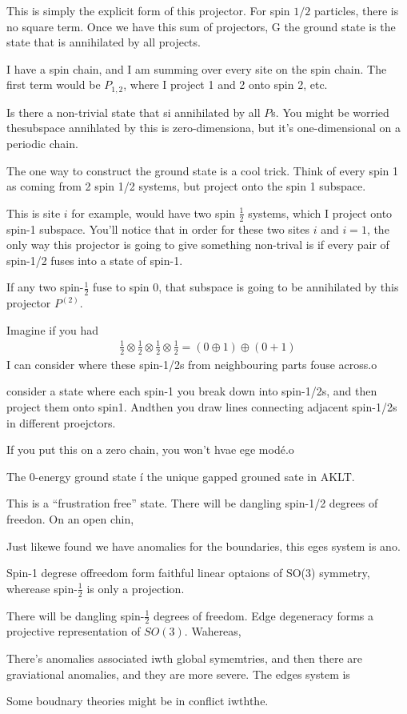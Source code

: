 This is simply the explicit form of this projector.
For spin $1/2$ particles,
there is no square term.
Once we have this sum of projectors,
G
the ground state is the state that is annihilated by all projects.

I have a spin chain,
and I am summing over every site on the spin chain.
The first term would be $P_{1,2}$,
where I project 1 and 2 onto spin 2, etc.

Is there a non-trivial state that si annihilated by all $P$s.
You might be worried thesubspace annihlated by this is zero-dimensiona,
but it's one-dimensional on a periodic chain.

The one way to construct the ground state is a cool trick.
Think of every spin 1 as coming from 2 spin 1/2 systems,
but project onto the spin 1 subspace.

This is site $i$ for example,
would have two spin $\frac{1}{2}$ systems,
which I project onto spin-1 subspace.
You'll notice that in order for these two sites $i$ and $i=1$,
the only way this projector is going to give something non-trival
is if every pair of spin-1/2 fuses into a state of spin-1.

If any two spin-$\frac{1}{2}$ fuse to spin 0,
that subspace is going to be annihilated by this projector
$P^{(2)}$.

Imagine if you had
\begin{align}
    \frac{1}{2}\otimes \frac{1}{2}\otimes
    \frac{1}{2}\otimes \frac{1}{2}
    =
    (0 \oplus 1) \oplus (0 + 1)
\end{align}
I can consider where these spin-1/2s from neighbouring parts fouse across.o

consider a state
where each spin-1 you break down into spin-1/2s,
and then project them onto spin1.
Andthen you draw lines connecting adjacent spin-1/2s in different proejctors.

If you put this on a zero chain,
you won't hvae ege modé.o

The 0-energy ground state í the unique gapped grouned sate in AKLT.

This is a ``frustration free'' state.
There will be dangling spin-1/2 degrees of freedon.
On an open chin,

Just likewe found we have anomalies for the boundaries,
this eges system is ano.

Spin-1 degrese offreedom form faithful linear optaions of SO(3) symmetry,
wherease spin-$\frac{1}{2}$ is only a projection.

There will be dangling spin-$\frac{1}{2}$ degrees of freedom.
Edge degeneracy forms a projective representation of $SO(3)$.
Wahereas,

There's anomalies associated iwth global symemtries,
and then there are graviational anomalies,
and they are more severe.
The edges system is 

Some boudnary theories might be in conflict iwththe.
